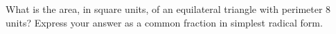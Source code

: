 What is the area, in square units, of an equilateral triangle with perimeter $8$ units? Express your answer as a common fraction in simplest radical form.
